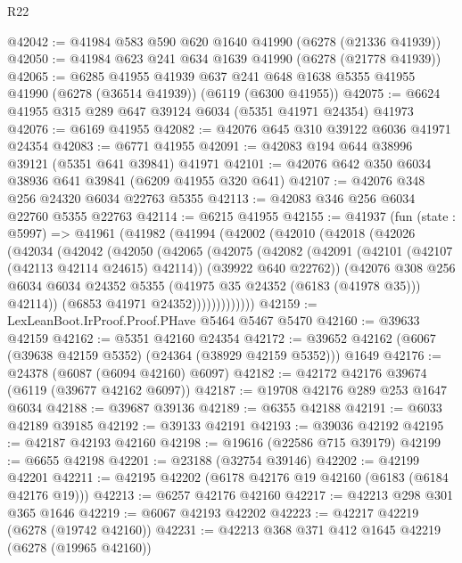 \begin{lexlean}{R22}
\begin{coremodule}
@42042 := @41984 @583 @590 @620 @1640 @41990 (@6278 (@21336 @41939))
@42050 := @41984 @623 @241 @634 @1639 @41990 (@6278 (@21778 @41939))
@42065 := @6285
    @41955
    @41939
    @637
    @241
    @648
    @1638
    @5355
    @41955
    @41990
    (@6278 (@36514 @41939))
    (@6119 (@6300 @41955))
@42075 := @6624 @41955 @315 @289 @647 @39124 @6034 (@5351 @41971 @24354) @41973
@42076 := @6169 @41955
@42082 := @42076 @645 @310 @39122 @6036 @41971 @24354
@42083 := @6771 @41955
@42091 := @42083 @194 @644 @38996 @39121 (@5351 @641 @39841) @41971
@42101 := @42076 @642 @350 @6034 @38936 @641 @39841 (@6209 @41955 @320 @641)
@42107 := @42076 @348 @256 @24320 @6034 @22763 @5355
@42113 := @42083 @346 @256 @6034 @22760 @5355 @22763
@42114 := @6215 @41955
@42155 := @41937
    (fun (state : @5997) =>
    @41961
      (@41982
        (@41994
          (@42002
            (@42010
              (@42018
                (@42026
                  (@42034
                    (@42042
                      (@42050
                        (@42065
                          (@42075
                            (@42082
                              (@42091
                                (@42101 (@42107 (@42113 @42114 @24615) @42114))
                                (@39922 @640 @22762))
                              (@42076
                                @308
                                @256
                                @6034
                                @6034
                                @24352
                                @5355
                                (@41975 @35 @24352 (@6183 (@41978 @35)))
                                @42114))
                            (@6853 @41971 @24352)))))))))))))
@42159 := LexLeanBoot.IrProof.Proof.PHave @5464 @5467 @5470
@42160 := @39633 @42159
@42162 := @5351 @42160 @24354
@42172 := @39652 @42162 (@6067 (@39638 @42159 @5352) (@24364 (@38929 @42159 @5352))) @1649
@42176 := @24378 (@6087 (@6094 @42160) @6097)
@42182 := @42172 @42176 @39674 (@6119 (@39677 @42162 @6097))
@42187 := @19708 @42176 @289 @253 @1647 @6034
@42188 := @39687 @39136
@42189 := @6355 @42188
@42191 := @6033 @42189 @39185
@42192 := @39133 @42191
@42193 := @39036 @42192
@42195 := @42187 @42193 @42160
@42198 := @19616 (@22586 @715 @39179)
@42199 := @6655 @42198
@42201 := @23188 (@32754 @39146)
@42202 := @42199 @42201
@42211 := @42195 @42202 (@6178 @42176 @19 @42160 (@6183 (@6184 @42176 @19)))
@42213 := @6257 @42176 @42160
@42217 := @42213 @298 @301 @365 @1646
@42219 := @6067 @42193 @42202
@42223 := @42217 @42219 (@6278 (@19742 @42160))
@42231 := @42213 @368 @371 @412 @1645 @42219 (@6278 (@19965 @42160))

\end{coremodule}
\end{lexlean}
